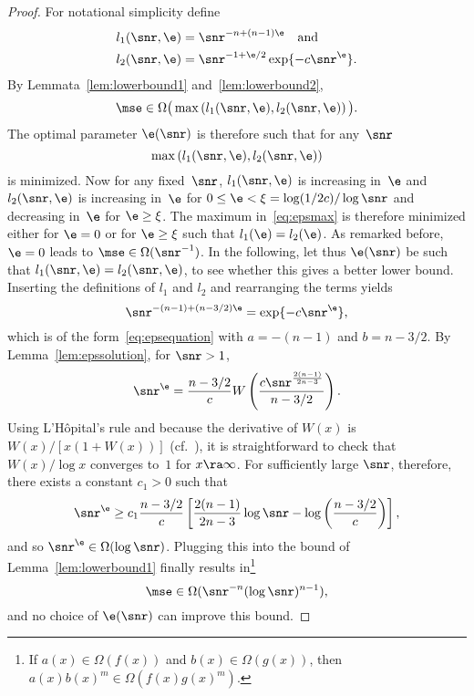 \begin{proof}
  For notational simplicity define
  \begin{align*}
    l_1(\snr, \e) &= \snr^{-n+(n-1)\e} \quad\text{and} \\
    l_2(\snr,\e) &= \snr^{-1+\e/2} \exp\{-c\snr^\e\}.
  \end{align*}
  By Lemmata~\ref{lem:lowerbound1} and~\ref{lem:lowerbound2},
  \begin{equation*}
    \mse \in \Omega\big(\max \left( l_1(\snr,\e), l_2(\snr,\e) \right) \big).
  \end{equation*}
  The optimal parameter $\e(\snr)$ is therefore such that for
  any~$\snr$
  \begin{equation}
    \label{eq:epsmax}
    \max\left( l_1(\snr,\e), l_2(\snr,\e) \right)
  \end{equation}
  is minimized. Now for any fixed~$\snr$, $l_1(\snr,\e)$ is increasing in~$\e$
  and $l_2(\snr,\e)$ is increasing in~$\e$ for $0 \le \e < \xi =
  \log(1/2c)/\log\snr$ and decreasing in~$\e$ for $\e \ge \xi$.  The maximum
  in~\eqref{eq:epsmax} is therefore minimized either for $\e = 0$ or for $\e \ge
  \xi$ such that $l_1(\e) = l_2(\e)$. As remarked before, $\e = 0$ leads to
  $\mse \in \Omega(\snr^{-1})$. In the following, let thus $\e(\snr)$ be such
  that $l_1(\snr,\e) = l_2(\snr, \e)$, to see whether this gives a better lower
  bound.  Inserting the definitions of $l_1$ and $l_2$ and rearranging the terms
  yields
  \begin{equation*}
    \snr^{-(n-1) + (n-3/2)\e} = \exp\{-c\snr^\e\},
  \end{equation*}
  which is of the form~\eqref{eq:epsequation} with $a = -(n-1)$ and $b = n-3/2$.
  By Lemma~\ref{lem:epssolution}, for $\snr > 1$,
  \begin{equation*}
    \snr^\e = \frac{n-3/2}{c}
    W\left( \frac{c\snr^{\frac{2(n-1)}{2n-3}}}{n-3/2} \right).
  \end{equation*}
  Using L'H\^opital's rule and because the derivative of
  $W(x)$ is $W(x)/[x(1 + W(x))]$ (cf.~\cite{CorlessGHJK1996}), it is
  straightforward to check that $W(x)/\log x$ converges to~$1$ for $x \ra
  \infty$.  For sufficiently large $\snr$, therefore, there exists a constant
  $c_1 > 0$ such that
  \begin{equation*}
    \snr^\e \ge c_1 \frac{n-3/2}{c} \left[ \frac{2(n-1)}{2n-3}\log\snr -
    \log\left(\frac{n-3/2}{c}\right)
    \right],
  \end{equation*}
  and so $\snr^\e \in \Omega(\log\snr)$. Plugging this into the bound of
  Lemma~\ref{lem:lowerbound1} finally results in\footnote{If $a(x) \in
  \Omega(f(x))$ and $b(x) \in \Omega(g(x))$, then $a(x)b(x)^m \in
  \Omega(f(x)g(x)^m)$.}
  \begin{equation*}
    \mse \in \Omega(\snr^{-n}(\log\snr)^{n-1}),
  \end{equation*}
  and no choice of $\e(\snr)$ can improve this bound.
\end{proof}


